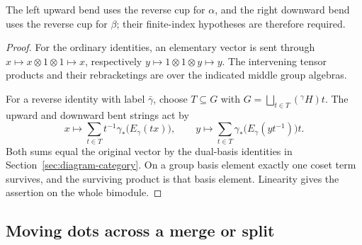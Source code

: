 \documentclass[11pt,a4paper]{article}
\numberwithin{equation}{section}
\theoremstyle{definition}
\newcommand{\cg}[2]{{}^{#1}\!#2}
\begin{document}
The left upward bend uses the reverse cup for \(\alpha\), and the
right downward bend uses the reverse cup for \(\beta\); their
finite-index hypotheses are therefore required.

\begin{proof}
For the ordinary identities, an elementary vector is sent through
\(x\mapsto x\otimes1\otimes1\mapsto x\), respectively
\(y\mapsto1\otimes1\otimes y\mapsto y\).
The intervening tensor products and their rebracketings are over
the indicated middle group algebras.

For a reverse identity with label \(\bar\gamma\), choose
\(T\subseteq G\) with
\(G=\bigsqcup_{t\in T}(\cg{\gamma}{H})t\).
The upward and downward bent strings act by
\[
 x\longmapsto\sum_{t\in T}t^{-1}\gamma_*\bigl(E_\gamma(tx)\bigr),
 \qquad
 y\longmapsto\sum_{t\in T}\gamma_*\bigl(E_\gamma(yt^{-1})\bigr)t.
\]
Both sums equal the original vector by the dual-basis identities
in Section~\ref{sec:diagram-category}. On a group basis element
exactly one coset term survives, and the surviving product is that
basis element. Linearity gives the assertion on the whole bimodule.
\end{proof}


\subsection{Moving dots across a merge or split}
\end{document}
